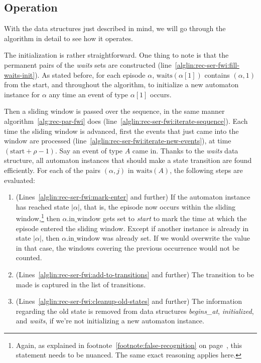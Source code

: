 \subsection{Operation}

With the data structures just described in mind, we will go through the algorithm in detail to see how it operates.

The initialization is rather straightforward. One thing to note is that the permanent pairs of the \emph{waits} sets are constructed (line~\ref{alglin:rec-ser-fwi:fill-waits-init}). As stated before, for each episode $ \alpha $, $ \text{waits}(\alpha[1]) $ contains $ (\alpha, 1) $ from the start, and throughout the algorithm, to initialize a new automaton instance for $ \alpha $ any time an event of type $ \alpha[1] $ occurs.

Then a sliding window is passed over the sequence, in the same manner algorithm~\ref{alg:rec-par-fwi} does (line~\ref{alglin:rec-ser-fwi:iterate-sequence}). Each time the sliding window is advanced, first the events that just came into the window are processed (line~\ref{alglin:rec-ser-fwi:iterate-new-events}), at time $ (\text{start} + \rho - 1) $. Say an event of type $ A $ came in. Thanks to the \emph{waits} data structure, all automaton instances that should make a state transition are found efficiently. For each of the pairs $ (\alpha, j) $ in $ \text{waits}(A) $, the following steps are evaluated:

\begin{enumerate}
\item (Lines~\ref{alglin:rec-ser-fwi:mark-enter} and further) If the automaton instance has reached state $ | \alpha | $, that is, the episode now occurs within the sliding window,\footnote{Again, as explained in footnote~\ref{footnote:false-recognition} on page~\pageref{footnote:false-recognition}, this statement needs to be nuanced. The same exact reasoning applies here.} then $ \alpha \text{.in\_window} $ gets set to \emph{start} to mark the time at which the episode entered the sliding window. Except if another instance is already in state $ | \alpha | $, then $ \alpha \text{.in\_window} $ was already set. If we would overwrite the value in that case, the windows covering the previous occurrence would not be counted.
\item (Lines~\ref{alglin:rec-ser-fwi:add-to-transitions} and further) The transition to be made is captured in the list of transitions.
\item (Lines~\ref{alglin:rec-ser-fwi:cleanup-old-states} and further) The information regarding the old state is removed from data structures \emph{begins\_at}, \emph{initialized}, and \emph{waits}, if we're not initializing a new automaton instance.
\end{enumerate}

